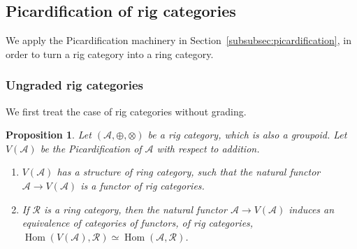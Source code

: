 \documentclass[JEP,XML,SOM,Unicode,published]{cedram}
\theoremstyle{plain}
\newtheorem{proposition}[theorem]{Proposition}
\theoremstyle{definition}
\newcommand{\Acal}{\mathcal A}
\newcommand{\Rcal}{\mathcal R}
\DeclareMathOperator{\Hom}{Hom}
\begin{document}
\subsection{Picardification of rig categories}
We apply the Picardification machinery in Section~\ref{subsubsec:picardification}, in order to turn a rig category into a ring category.
\subsubsection{Ungraded rig categories}
We first treat the case of rig categories without grading.
\begin{proposition}\label{prop:rig-to-ring-1}
Let $(\Acal,\oplus,\otimes)$ be a rig category, which is also a groupoid. Let $V(\Acal)$ be the Picardification of $\Acal$ with respect to addition.
\begin{enumerate}
\item $V(\Acal)$ has a structure of ring category, such that the natural functor $\Acal\to V(\Acal)$ is a functor of rig categories.
\item If $\Rcal$ is a ring category, then the natural functor $\Acal\to V(\Acal)$ induces an equivalence of categories of functors, of rig categories, $\Hom(V(\Acal),\Rcal)\simeq\Hom (\Acal,\Rcal)$.
\end{enumerate}
\end{proposition}
\end{document}

